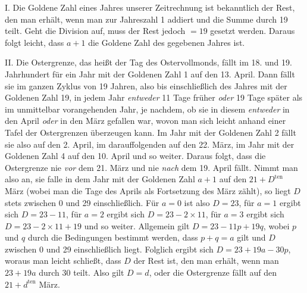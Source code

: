 I. Die Goldene Zahl eines Jahres unserer Zeitrechnung ist bekanntlich der Rest, den man erhält, wenn man zur Jahreszahl 1 addiert und die Summe durch 19 teilt. Geht die Division auf, muss der Rest jedoch $=19$ gesetzt werden. Daraus folgt leicht, dass $a+1$ die Goldene Zahl des gegebenen Jahres ist.

II. Die Ostergrenze, das heißt der Tag des Ostervollmonds, fällt im 18. und 19. Jahrhundert für ein Jahr mit der Goldenen Zahl 1 auf den 13. April. Dann fällt sie im ganzen Zyklus von 19 Jahren, also bis einschließlich des Jahres mit der Goldenen Zahl 19, in jedem Jahr \textit{entweder} 11 Tage früher \textit{oder} 19 Tage später als im unmittelbar vorangehenden Jahr, je nachdem, ob sie in diesem \textit{entweder} in den April \textit{oder} in den März gefallen war, wovon man sich leicht anhand einer Tafel der Ostergrenzen überzeugen kann. Im Jahr mit der Goldenen Zahl 2 fällt sie also auf den 2. April, im darauffolgenden auf den 22. März, im Jahr mit der Goldenen Zahl 4 auf den 10. April und so weiter. Daraus folgt, dass die Ostergrenze nie \textit{vor} dem 21. März und nie \textit{nach} dem 19. April fällt. Nimmt man also an, sie falle in dem Jahr mit der Goldenen Zahl $a+1$ auf den $21+D^{\mathrm{ten}}$ März (wobei man die Tage des Aprils als Fortsetzung des März zählt), so liegt $D$ stets zwischen 0 und 29 einschließlich. Für $a=0$ ist also $D=23$, für $a=1$ ergibt sich $D=23-11$, für $a=2$ ergibt sich $D=23-2\times11$, für $a=3$ ergibt sich $D=23-2\times11+19$ und so weiter. Allgemein gilt $D=23-11p+19q$, wobei $p$ und $q$ durch die Bedingungen bestimmt werden, dass $p+q=a$ gilt und $D$ zwischen 0 und 29 einschließlich liegt. Folglich ergibt sich $D=23+19a-30p$, woraus man leicht schließt, dass $D$ der Rest ist, den man erhält, wenn man $23+19a$ durch 30 teilt. Also gilt $D=d$, oder die Ostergrenze fällt auf den $21+d^{\mathrm{ten}}$ März.

